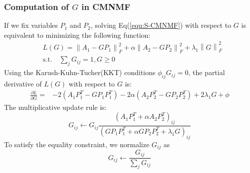 \documentclass{bmcart}
\begin{document}
\subsubsection*{\textbf{Computation of $G$ in CMNMF}}
If we fix variables $P_1$ and $P_2$, solving Eq(\ref{equ:S-CMNMF}) with respect to $G$ is equivalent to minimizing the following function:
\begin{equation}\label{obj:obj_G}\nonumber
\begin{split}
&L(G)=\left\| {{A_1} - GP_1} \right\|_F^2 + \alpha \left\| {{A_2} - G{P_2}} \right\|_F^2
     +{\lambda _1}\left\| G \right\|_F^2\\
     &\mathrm{s.t. }\quad \sum_jG_{ij}=1,G\ge 0
\end{split}
\end{equation}
Using the Karush-Kuhn-Tucher(KKT) conditions $\phi_{ij}G_{ij}=0$, the partial derivative of $L(G)$ with respect to $G$ is:
\begin{equation}\label{equ:G_gradient}\nonumber
\begin{split}
\frac{\partial{L}}{\partial{G}}=
&-2(A_1{P_1^T} - G{P_1}{P_1^T})-2\alpha(A_2{P_2^T} - G{P_2}{P_2^T})+2\lambda_1G+\phi
\end{split}
\end{equation}
The multiplicative update rule is:
\begin{equation}\label{equ:updating_G}\nonumber
G_{ij}\leftarrow G_{ij}
\frac{(A_1P_1^T+\alpha A_2P_2^T)_{ij}}
{(GP_1P_1^T+\alpha GP_2P_2^T+\lambda_1G)_{ij}}
\end{equation}
To satisfy the equality constraint, we normalize $G_{ij}$ as
\begin{equation}\label{equ:updating_G}\nonumber
G_{ij}\leftarrow \frac{G_{ij}}{\sum_{j}G_{ij}}
\end{equation}

\end{document}
